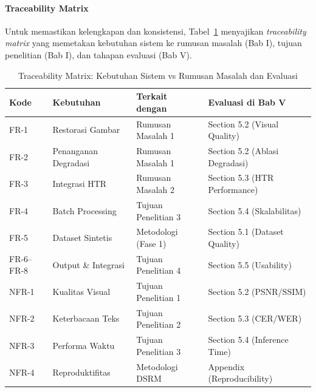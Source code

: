 \documentclass[12pt,a4paper]{article}
\begin{document}
\paragraph{Traceability Matrix}

Untuk memastikan kelengkapan dan konsistensi, Tabel~\ref{tab:traceability-matrix} menyajikan \textit{traceability matrix} yang memetakan kebutuhan sistem ke rumusan masalah (Bab I), tujuan penelitian (Bab I), dan tahapan evaluasi (Bab V).

\begin{table}[htbp!]
\centering
\small
\caption{Traceability Matrix: Kebutuhan Sistem vs Rumusan Masalah dan Evaluasi}
\label{tab:traceability-matrix}
\begin{tabular}{p{}p{}p{}p{}}
\toprule
\textbf{Kode} & \textbf{Kebutuhan} & \textbf{Terkait dengan} & \textbf{Evaluasi di Bab V} \\
\midrule
FR-1 & Restorasi Gambar & Rumusan Masalah 1 & Section 5.2 (Visual Quality) \\
\midrule
FR-2 & Penanganan Degradasi & Rumusan Masalah 1 & Section 5.2 (Ablasi Degradasi) \\
\midrule
FR-3 & Integrasi HTR & Rumusan Masalah 2 & Section 5.3 (HTR Performance) \\
\midrule
FR-4 & Batch Processing & Tujuan Penelitian 3 & Section 5.4 (Skalabilitas) \\
\midrule
FR-5 & Dataset Sintetis & Metodologi (Fase 1) & Section 5.1 (Dataset Quality) \\
\midrule
FR-6--FR-8 & Output \& Integrasi & Tujuan Penelitian 4 & Section 5.5 (Usability) \\
\midrule
NFR-1 & Kualitas Visual & Tujuan Penelitian 1 & Section 5.2 (PSNR/SSIM) \\
\midrule
NFR-2 & Keterbacaan Teks & Tujuan Penelitian 2 & Section 5.3 (CER/WER) \\
\midrule
NFR-3 & Performa Waktu & Tujuan Penelitian 3 & Section 5.4 (Inference Time) \\
\midrule
NFR-4 & Reproduktifitas & Metodologi DSRM & Appendix (Reproducibility) \\
\bottomrule
\end{tabular}
\end{table}
\end{document}
